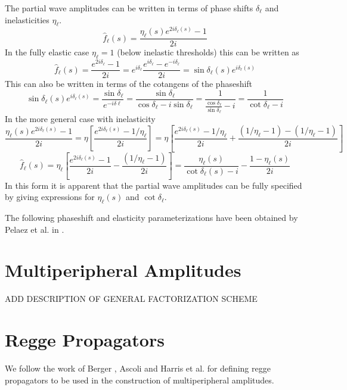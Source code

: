 \documentclass[12pt]{article}
\begin{document}
The partial wave amplitudes can be written in terms of phase shifts $\delta_\ell$ and inelasticities $\eta_\ell$. 
\begin{equation}
\hat{f}_\ell(s)=\frac{\eta_\ell(s) e^{2i\delta_\ell(s)} -1}{2i}
\end{equation}
In the fully elastic case $\eta_\ell=1$ (below inelastic thresholds) this can be written as
\begin{equation}
\hat{f}_\ell(s)=\frac{e^{2i\delta_\ell} -1}{2i}=e^{i\delta_\ell}\frac{e^{i\delta_\ell}-e^{-i\delta_\ell}}{2i}=\sin\delta_\ell(s)e^{i\delta_\ell(s)}
\end{equation}
This can also be written in terms of the cotangens of the phaseshift
\begin{equation}
\sin\delta_\ell(s)e^{i\delta_\ell(s)}=\frac{\sin\delta_\ell}{e^{-i\delta\ell}}=\frac{\sin \delta_\ell}{\cos \delta_\ell - i\sin\delta_\ell}=\frac{1}{\frac{\cos\delta_\ell}{\sin\delta_\ell}-i}=\frac{1}{\cot\delta_\ell-i}
\end{equation}
In the more general case with inelasticity
\begin{equation}
  \frac{\eta_\ell(s) e^{2i\delta_\ell(s)} -1}{2i}=\eta\left[\frac{e^{2i\delta_\ell(s)} -1/\eta_\ell}{2i}\right]=\eta\left[\frac{e^{2i\delta_\ell(s)} -1/\eta_\ell}{2i}+\frac{(1/\eta_\ell-1) - (1/\eta_\ell -1)}{2i} \right]
\end{equation}
\begin{equation}
\hat{f}_\ell(s)=\eta_\ell\left[\frac{e^{2i\delta_\ell(s)} -1}{2i}-\frac{(1/\eta_\ell -1)}{2i} \right]=\frac{\eta_\ell(s)}{\cot\delta_\ell(s)-i}-\frac{1-\eta_\ell(s)}{2i}
\end{equation}
In this form it is apparent that the partial wave amplitudes can be fully specified by giving expressions for $\eta_\ell(s)$ and $\cot\delta_\ell$.

The following phaseshift and elasticity parameterizations have been obtained by Pelaez et al. in \cite{pipiI,pipiII,pipiIII}.

\section{Multiperipheral Amplitudes}
ADD DESCRIPTION OF GENERAL FACTORIZATION SCHEME

\section{Regge Propagators}

We follow the work of Berger \cite{BergerDeck}, Ascoli \cite {AscoliDeck} and Harris et al.\cite{Harris} for defining regge propagators to be used in the construction of multiperipheral  amplitudes.
\end{document}
